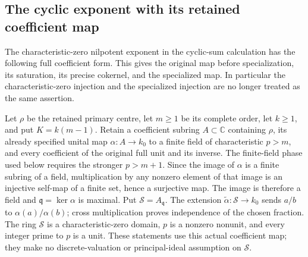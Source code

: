 
\subsection{The cyclic exponent with its retained coefficient map}
\label{sec:btp-cyclic-update}

The characteristic-zero nilpotent exponent in the cyclic-sum calculation
has the following full coefficient form.  This gives the original map
before specialization, its saturation, its precise cokernel, and the
specialized map.  In particular the characteristic-zero injection and
the specialized injection are no longer treated as the same assertion.

Let \(\rho\) be the retained primary centre, let \(m\geq1\) be its
complete order, let \(k\geq1\), and put \(K=k(m-1)\).  Retain a
coefficient subring \(A\subset\mathbb C\) containing \(\rho\), its already specified
unital map \(\alpha:A\to k_0\) to a finite field of characteristic
\(p>m\), and every coefficient of the original full unit and its
inverse.  The finite-field phase used below requires the stronger
\(p>m+1\).  Since the image of \(\alpha\) is a finite subring of a
field, multiplication by any nonzero element of that image is an
injective self-map of a finite set, hence a surjective map.  The image
is therefore a field and \(\mathfrak q=\ker\alpha\) is maximal.
Put \(\mathscr S=A_{\mathfrak q}\).  The extension
\(\widetilde\alpha:\mathscr S\to k_0\) sends \(a/b\) to
\(\alpha(a)/\alpha(b)\); cross multiplication proves independence
of the chosen fraction.  The ring \(\mathscr S\) is a characteristic-zero
domain, \(p\) is a nonzero nonunit, and every integer prime to \(p\)
is a unit.  These statements use this actual coefficient map; they
make no discrete-valuation or principal-ideal assumption on \(\mathscr S\).

